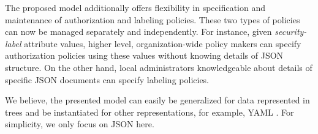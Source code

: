 





The proposed model additionally offers flexibility in specification and maintenance of  authorization and labeling policies. These two types of policies can now be managed separately and independently. For instance, given \textit{security-label} attribute values, higher level, organization-wide policy makers can specify authorization policies using these values without knowing details of JSON structure. On the other hand, local administrators knowledgeable about details of specific JSON documents can specify labeling policies. 


We believe, the presented model can easily be generalized for data represented in trees and be instantiated for other representations, for example, YAML \cite{yaml}. For simplicity, we only focus on JSON here.